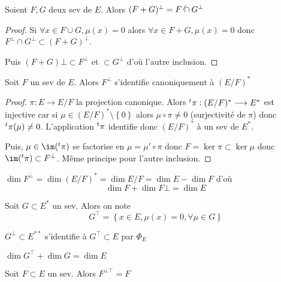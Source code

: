 \begin{prop}
    Soient $F, G$ deux sev de  $E$. Alors  $(F+G)^\bot =F^\not \cap G^\bot$
\end{prop}

\begin{proof}
    Si $\forall  x \in  F\cup G, \mu(x)=0$ alors $\forall  x \in  F+G, \mu(x)=0$ donc $F^\bot \cap G^\bot \subset (F+G)^\bot$.

    Puis  $(F+G)\bot \subset F^\bot$ et  $\subset G^\bot$ d'où l'autre inclusion.
\end{proof}

\begin{prop}
    Soit $F$ un sev de  $E$. Alors  $F^\bot$ s'identifie canoniquement à  $(E / F)^*$
\end{prop}

\begin{proof}
    $\pi:E \longrightarrow E / F$ la projection canonique. Alors ${}^t \pi:(E / F)^* \longrightarrow  E^*$ est injective car si $\mu \in  (E / F)^* \setminus \left\{ 0 \right\} $ alors $\mu \circ \pi\neq 0$ (surjectivité de $\pi$) donc ${}^t \pi (\mu)\neq  0$. L'application ${}^t \pi$ identifie donc  $(E / F)^*$ à un sev de  $E^*$.

    Puis, $\mu \in  \im(\transpose \pi)$ se factorise en $\mu=\mu'\circ \pi$ donc $F=\ker \pi \subset \ker \mu$ donc $\im(\transpose \pi)\subset F^\bot$. Même principe pour l'autre inclusion.
\end{proof}

\begin{cor}
    $\dim F^\bot=\dim (E / F)^* = \dim E / F = \dim E-  \dim F$ d'où  \[
    \dim F+\dim F\bot = \dim E
    \] 
\end{cor}

\begin{dfn}
Soit $G\subset E^*$ un sev. Alors  on note\[
    G^\top = \left\{ x \in  E, \mu(x)=0, \forall  \mu \in  G \right\} 
\] 
\end{dfn}

\begin{prop}
$G^\bot\subset E ^{**}$ s'identifie à $G^\top \subset E$ par  $\Phi_E$
\end{prop}

\begin{cor}
$\dim G^\top+\dim G=\dim E$
\end{cor}

\begin{prop}
Soit $F\subset E$ un sev. Alors  $F^{\bot\top}=F$
\end{prop}

